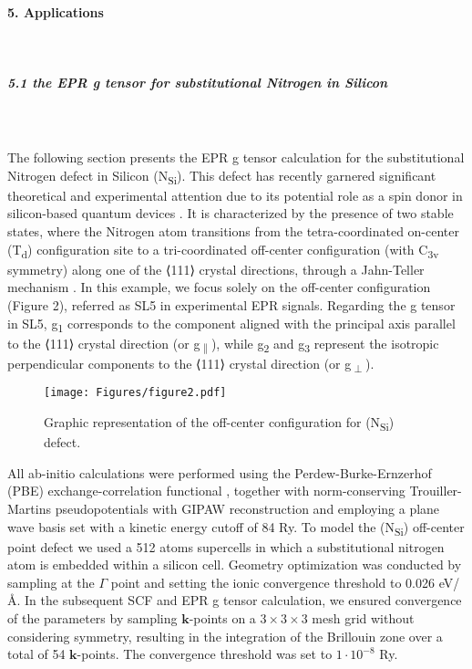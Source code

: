 \documentclass[final,3p,times,twocolumn]{elsarticle}
\begin{document}
\begin{small}
\vskip1.5cm
\paragraph{5. Applications} \
\vskip0.5cm
\noindent
\subparagraph{5.1 the EPR g tensor for substitutional Nitrogen in Silicon}\ \\ \\
The following section presents the EPR g tensor calculation for the substitutional Nitrogen defect in Silicon (N\textsubscript{Si}). This defect has recently garnered significant theoretical and experimental attention due to its potential role as a spin donor in silicon-based quantum devices \cite{PhysRevB.89.115207,nano14010021}. It is characterized by the presence of two stable states, where the Nitrogen atom transitions from the tetra-coordinated on-center (T\textsubscript{d}) configuration site to a tri-coordinated off-center configuration (with C\textsubscript{3v} symmetry) along one of the ⟨111⟩ crystal directions, through a Jahn-Teller mechanism \cite{nano13142123}. In this example, we focus solely on the off-center configuration (Figure 2), referred as SL5 in experimental EPR signals. Regarding the g tensor in SL5, g\textsubscript{1} corresponds to the component aligned with the principal axis parallel to the ⟨111⟩ crystal direction (or g\textsubscript{$\parallel$}), while g\textsubscript{2} and g\textsubscript{3} represent the isotropic perpendicular components to the ⟨111⟩ crystal direction (or g\textsubscript{$\perp$}).\\
\begin{figure*}
\centering
\texttt{[image: Figures/figure2.pdf]}
\caption{Graphic representation of the off-center configuration for (N\textsubscript{Si}) defect. }
\label{fig:figure2}
\end{figure*}
All ab-initio calculations were performed using the Perdew-Burke-Ernzerhof (PBE) exchange-correlation functional \cite{PhysRevLett.77.3865}, together with norm-conserving Trouiller-Martins pseudopotentials with GIPAW reconstruction and employing a plane wave basis set with a kinetic energy cutoff of 84 Ry. To model the (N\textsubscript{Si}) off-center point defect we used a 512 atoms supercells in which a substitutional nitrogen atom is embedded within a silicon cell. Geometry optimization was conducted by sampling at the $\Gamma$ point and setting the ionic convergence threshold to 0.026 eV/\r{A}. In the subsequent SCF and EPR g tensor calculation, we ensured convergence of the parameters by sampling $\mathbf{k}$-points on a $3\times 3\times 3$ mesh grid without considering symmetry, resulting in the integration of the Brillouin zone over a total of 54 $\mathbf{k}$-points. The convergence threshold was set to $1\cdot 10^{-8}$ Ry.\\
\vskip0.5cm


\end{small}
\end{document}

